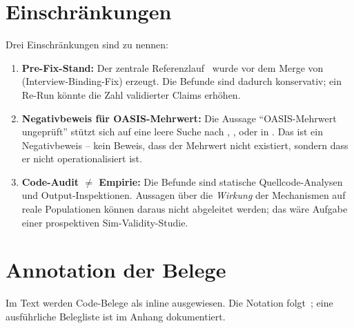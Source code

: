 \section{Einschränkungen}\label{sec:einschraenkungen}

Drei Einschränkungen sind zu nennen:

\begin{enumerate}
  \item \textbf{Pre-Fix-Stand:} Der zentrale Referenzlauf~\cite{audit-r2} wurde vor dem Merge von~ (Interview-Binding-Fix) erzeugt. Die Befunde sind dadurch konservativ; ein Re-Run könnte die Zahl validierter Claims erhöhen.
  \item \textbf{Negativbeweis für OASIS-Mehrwert:} Die Aussage \enquote{OASIS-Mehrwert ungeprüft} stützt sich auf eine leere Suche nach , ,  oder  in . Das ist ein Negativbeweis -- kein Beweis, dass der Mehrwert nicht existiert, sondern dass er nicht operationalisiert ist.
  \item \textbf{Code-Audit $\neq$ Empirie:} Die Befunde sind statische Quellcode-Analysen und Output-Inspektionen. Aussagen über die \emph{Wirkung} der Mechanismen auf reale Populationen können daraus nicht abgeleitet werden; das wäre Aufgabe einer prospektiven Sim-Validity-Studie.
\end{enumerate}

\section{Annotation der Belege}\label{sec:annotations2}

Im Text werden Code-Belege als \texttt{} inline ausgewiesen. Die Notation folgt~\cite{citation-registry}; eine ausführliche Belegliste ist im Anhang dokumentiert.